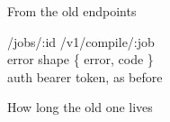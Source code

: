 
\begin{frame}{From the old endpoints}
  \begin{console}
   /jobs/:id       /v1/compile/:job\\
      error shape     \{ error, code \}\\
      auth            bearer token, as before
  \end{console}
\end{frame}

\begin{frame}{How long the old one lives}
\end{frame}
